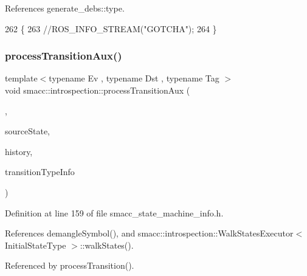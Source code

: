 References generate\+\_\+debs\+::type.


\begin{DoxyCode}
262 \{
263     \textcolor{comment}{//ROS\_INFO\_STREAM("GOTCHA");}
264 \}
\end{DoxyCode}
\mbox{\label{namespacesmacc_1_1introspection_a208cd71dc5579090d40b3d3b9efb28a6}} 
\subsubsection{\texorpdfstring{process\+Transition\+Aux()}{processTransitionAux()}}
{\footnotesize\ttfamily template$<$typename Ev , typename Dst , typename Tag $>$ \\
void smacc\+::introspection\+::process\+Transition\+Aux (\begin{DoxyParamCaption}\item[{\hyperlink{classsmacc_1_1Transition}{smacc\+::\+Transition}$<$ Ev, Dst, Tag $>$ $\ast$}]{,  }\item[{std\+::shared\+\_\+ptr$<$ \hyperlink{classsmacc_1_1introspection_1_1SmaccStateInfo}{Smacc\+State\+Info} $>$ \&}]{source\+State,  }\item[{\hyperlink{classbool}{bool}}]{history,  }\item[{\hyperlink{classsmacc_1_1introspection_1_1TypeInfo_aa6ffd9c39811d59f7c771941b7fad860}{Type\+Info\+::\+Ptr} \&}]{transition\+Type\+Info }\end{DoxyParamCaption})}



Definition at line 159 of file smacc\+\_\+state\+\_\+machine\+\_\+info.\+h.



References demangle\+Symbol(), and smacc\+::introspection\+::\+Walk\+States\+Executor$<$ Initial\+State\+Type $>$\+::walk\+States().



Referenced by process\+Transition().


